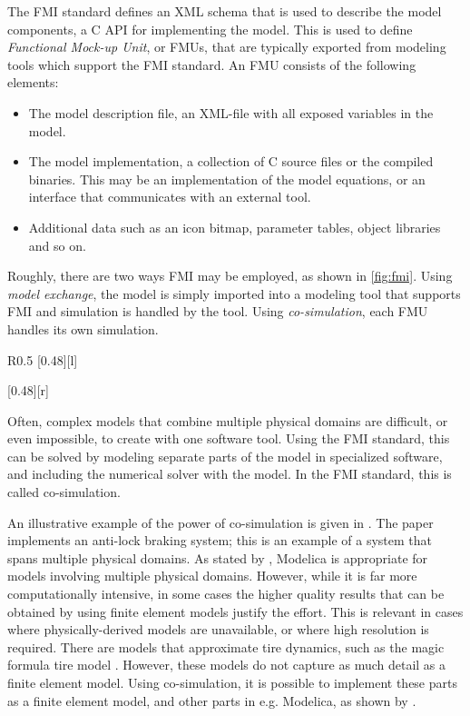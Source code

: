 \documentclass[\rootfolder/main.tex]{subfiles}
\begin{document}
The FMI standard defines an XML schema that is used to describe the model components, a C API for implementing the model.
This is used to define \emph{Functional Mock-up Unit}, or FMUs, that are typically exported from modeling tools which support the FMI standard.
An FMU consists of the following elements:

\begin{itemize}
    \item The model description file, an XML-file with all exposed variables in the model.
    \item The model implementation, a collection of C source files or the compiled binaries.
        This may be an implementation of the model equations, or an interface that communicates with an external tool.
    \item Additional data such as an icon bitmap, parameter tables, object libraries and so on.
\end{itemize}

Roughly, there are two ways FMI may be employed, as shown in \cref{fig:fmi}.
Using \emph{model exchange}, the model is simply imported into a modeling tool that supports FMI and simulation is handled by the tool.
Using \emph{co-simulation}, each FMU handles its own simulation.

\begin{wrapfigure}{R}{0.5\columnwidth}
    \centering
    [0.48\columnwidth][l]{}\par\bigskip
    [0.48\columnwidth][r]{}
    \caption{Illustration of the two interface types specified in the FMI standard.\label{fig:fmi}}
\end{wrapfigure}

Often, complex models that combine multiple physical domains are difficult, or even impossible, to create with one software tool.
Using the FMI standard, this can be solved by modeling separate parts of the model in specialized software, and including the numerical solver with the model.
In the FMI standard, this is called co-simulation.

An illustrative example of the power of co-simulation is given in \cite{Schofield}. 
The paper implements an anti-lock braking system; this is an example of a system that spans multiple physical domains.
As stated by \cite{Schofield}, Modelica is appropriate for models involving multiple physical domains.
However, while it is far more computationally intensive, in some cases the higher quality results that can be obtained by using finite element models justify the effort.
This is relevant in cases where physically-derived models are unavailable, or where high resolution is required.
There are models that approximate tire dynamics, such as the magic formula tire model \cite{Pacejka2012}.
However, these models do not capture as much detail as a finite element model.
Using co-simulation, it is possible to implement these parts as a finite element model, and other parts in e.g. Modelica, as shown by \cite{Schofield}.
\end{document}

